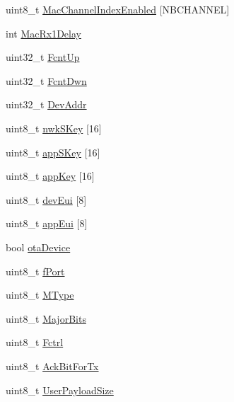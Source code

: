 \begin{DoxyCompactItemize}
\item 
uint8\+\_\+t \mbox{\hyperlink{class_lora_wan_container_acd49152da70498fc82299e77b2ede009}{Mac\+Channel\+Index\+Enabled}} \mbox{[}N\+B\+C\+H\+A\+N\+N\+EL\mbox{]}
\item 
int \mbox{\hyperlink{class_lora_wan_container_af547f45dbe7cc0255396cfa85ba9533a}{Mac\+Rx1\+Delay}}
\item 
uint32\+\_\+t \mbox{\hyperlink{class_lora_wan_container_a57741eeabfb00a58e90368f2134ce7f8}{Fcnt\+Up}}
\item 
uint32\+\_\+t \mbox{\hyperlink{class_lora_wan_container_aab64c8697dcf132852ff7f326f2a806a}{Fcnt\+Dwn}}
\item 
uint32\+\_\+t \mbox{\hyperlink{class_lora_wan_container_aae352b955ec64652c64084de67d6309f}{Dev\+Addr}}
\item 
uint8\+\_\+t \mbox{\hyperlink{class_lora_wan_container_a93c94009fe081053ce73e0b10e05625b}{nwk\+S\+Key}} \mbox{[}16\mbox{]}
\item 
uint8\+\_\+t \mbox{\hyperlink{class_lora_wan_container_abc0d832ba6477333a41e558704acc4e9}{app\+S\+Key}} \mbox{[}16\mbox{]}
\item 
uint8\+\_\+t \mbox{\hyperlink{class_lora_wan_container_a0453cc125759e3b32f8b6e28548dee84}{app\+Key}} \mbox{[}16\mbox{]}
\item 
uint8\+\_\+t \mbox{\hyperlink{class_lora_wan_container_ad4daef996cdb75fe3b0d33076b73dd2f}{dev\+Eui}} \mbox{[}8\mbox{]}
\item 
uint8\+\_\+t \mbox{\hyperlink{class_lora_wan_container_a4cf3acd6dbeebd4bd11f79326fcf5047}{app\+Eui}} \mbox{[}8\mbox{]}
\item 
bool \mbox{\hyperlink{class_lora_wan_container_a41cc43d7525d3c7fca17d06261d3f1f3}{ota\+Device}}
\item 
uint8\+\_\+t \mbox{\hyperlink{class_lora_wan_container_aefbb9daa1fdad56b7b3a7cd24d55d45f}{f\+Port}}
\item 
uint8\+\_\+t \mbox{\hyperlink{class_lora_wan_container_a3381c216b989d3df72caee46d96d439a}{M\+Type}}
\item 
uint8\+\_\+t \mbox{\hyperlink{class_lora_wan_container_a75a3db621a664daa6dbc0264ccc5d3fd}{Major\+Bits}}
\item 
uint8\+\_\+t \mbox{\hyperlink{class_lora_wan_container_a4892444ed5c7fa20cbf9c45a5da7ed22}{Fctrl}}
\item 
uint8\+\_\+t \mbox{\hyperlink{class_lora_wan_container_ac150bed1ff68289d9eb4dcefdd840629}{Ack\+Bit\+For\+Tx}}
\item 
uint8\+\_\+t \mbox{\hyperlink{class_lora_wan_container_ac0d2069ce7801e053b0c18c7bcb99461}{User\+Payload\+Size}}

\end{DoxyCompactItemize}
